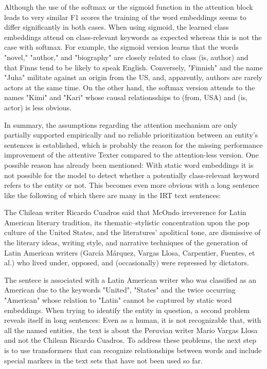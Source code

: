 Although the use of the softmax or the sigmoid function in the attention block leads to very similar F1 scores the training of the word embeddings seems to differ significantly in both cases. When using sigmoid, the learned class embeddings attend on class-relevant keywords as expected whereas this is not the case with softmax. For example, the sigmoid version learns that the words "novel," "author," and "biography" are closely related to class (is, author) and that Finns tend to be likely to speak English. Conversely, "Finnish" and the name "Juha" militate against an origin from the US, and, apparently, authors are rarely actors at the same time. On the other hand, the softmax version attends to the names "Kimi" and "Kari" whose causal relationsships to (from, USA) and (is, actor) is less obvious.

In summary, the assumptions regarding the attention mechanism are only partially supported empirically and no reliable prioritization between an entity's sentences is established, which is probably the reason for the missing performance improvement of the attentive Texter compared to the attention-less version. One possible reason has already been mentioned: With static word embeddings it is not possible for the model to detect whether a potentially class-relevant keyword refers to the entity or not. This becomes even more obvious with a long sentence like the following of which there are many in the IRT text sentences:

\begin{displayquote}
    The Chilean writer Ricardo Cuadros said that McOndo irreverence for Latin American literary tradition, its thematic–stylistic concentration upon the pop culture of the United States, and the literatures’ apolitical tone, are dismissive of the literary ideas, writing style, and narrative techniques of the generation of Latin American writers (García Márquez, Vargas Llosa, Carpentier, Fuentes, et al.) who lived under, opposed, and (occasionally) were repressed by dictators.
\end{displayquote}

The sentece is associated with a Latin American writer who was classified as an American due to the keywords "United", "States" and the twice occurring "American" whose relation to "Latin" cannot be captured by static word embeddings. When trying to identify the entity in question, a second problem reveals itself in long sentences: Even as a human, it is not recognizable that, with all the named entities, the text is about the Peruvian writer Mario Vargas Llosa and not the Chilean Ricardo Cuadros. To address these problems, the next step is to use transformers that can recognize relationships between words and include special markers in the text sets that have not been used so far.
